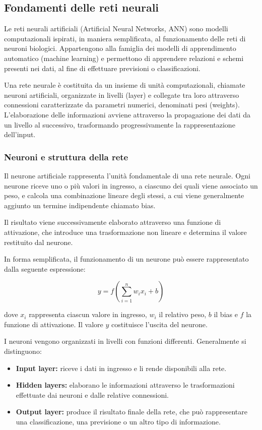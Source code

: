 \subsection{Fondamenti delle reti neurali}

Le reti neurali artificiali (Artificial Neural Networks, ANN) sono modelli computazionali ispirati, in maniera semplificata, al funzionamento delle reti di neuroni biologici. Appartengono alla famiglia dei modelli di apprendimento automatico (machine learning) e permettono di apprendere relazioni e schemi presenti nei dati, al fine di effettuare previsioni o classificazioni.

Una rete neurale è costituita da un insieme di unità computazionali, chiamate neuroni artificiali, organizzate in livelli (layer) e collegate tra loro attraverso connessioni caratterizzate da parametri numerici, denominati pesi (weights). L'elaborazione delle informazioni avviene attraverso la propagazione dei dati da un livello al successivo, trasformando progressivamente la rappresentazione dell'input.

\subsubsection{Neuroni e struttura della rete}

Il neurone artificiale rappresenta l'unità fondamentale di una rete neurale. Ogni neurone riceve uno o più valori in ingresso, a ciascuno dei quali viene associato un peso, e calcola una combinazione lineare degli stessi, a cui viene generalmente aggiunto un termine indipendente chiamato bias.

Il risultato viene successivamente elaborato attraverso una funzione di attivazione, che introduce una trasformazione non lineare e determina il valore restituito dal neurone.

In forma semplificata, il funzionamento di un neurone può essere rappresentato dalla seguente espressione:

\[
    y = f\left(\sum_{i=1}^{n} w_i x_i + b\right)
\]

dove \(x_i\) rappresenta ciascun valore in ingresso, \(w_i\) il relativo peso, \(b\) il bias e \(f\) la funzione di attivazione. Il valore \(y\) costituisce l'uscita del neurone.

I neuroni vengono organizzati in livelli con funzioni differenti. Generalmente si distinguono:

\begin{itemize}
    \item \textbf{Input layer:} riceve i dati in ingresso e li rende disponibili alla rete.
    \item \textbf{Hidden layers:} elaborano le informazioni attraverso le trasformazioni effettuate dai neuroni e dalle relative connessioni.
    \item \textbf{Output layer:} produce il risultato finale della rete, che può rappresentare una classificazione, una previsione o un altro tipo di informazione.
\end{itemize}

